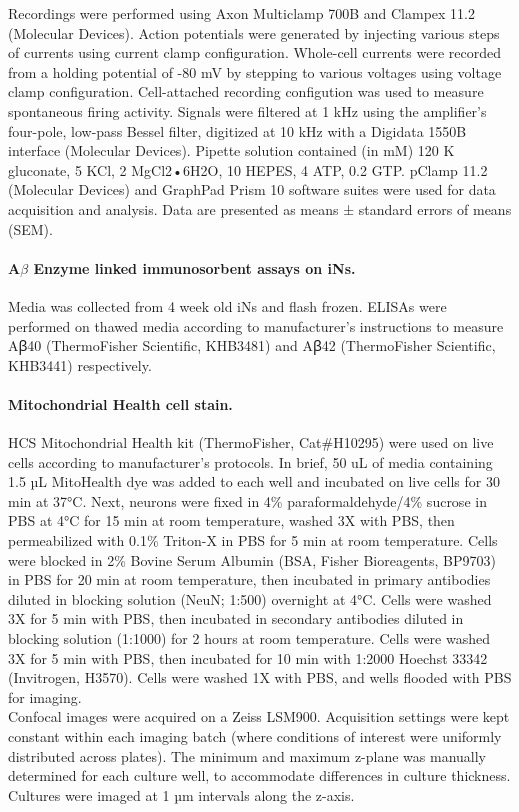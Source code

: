 Recordings were performed using Axon Multiclamp 700B and Clampex 11.2 (Molecular Devices). Action potentials were generated by injecting various steps of currents using current clamp configuration.  Whole-cell currents were recorded from a holding potential of -80 mV by stepping to various voltages using voltage clamp configuration. Cell-attached recording configution was used to measure spontaneous firing activity. Signals were filtered at 1 kHz using the amplifier’s four-pole, low-pass Bessel filter, digitized at 10 kHz with a Digidata 1550B interface (Molecular Devices). Pipette solution contained (in mM) 120 K gluconate, 5 KCl, 2 MgCl2•6H2O, 10 HEPES, 4 ATP, 0.2 GTP. pClamp 11.2 (Molecular Devices) and GraphPad Prism 10 software suites were used for data acquisition and analysis. Data are presented as means ± standard errors of means (SEM).

\paragraph{A$\beta$ Enzyme linked immunosorbent assays on iNs.}
Media was collected from 4 week old iNs and flash frozen. ELISAs were performed on thawed media according to manufacturer’s instructions to measure Aꞵ40 (ThermoFisher Scientific, KHB3481) and Aꞵ42 (ThermoFisher Scientific, KHB3441) respectively.

\paragraph{Mitochondrial Health cell stain.}
HCS Mitochondrial Health kit (ThermoFisher, Cat\#H10295) were used on live cells according to manufacturer’s protocols. In brief, 50 uL of media containing 1.5 µL MitoHealth dye was added to each well and incubated on live cells for 30 min at 37°C. Next, neurons were fixed in 4\% paraformaldehyde/4\% sucrose in PBS at 4°C for 15 min at room temperature, washed 3X with PBS, then permeabilized with 0.1\% Triton-X in PBS for 5 min at room temperature. Cells were blocked in 2\% Bovine Serum Albumin (BSA, Fisher Bioreagents, BP9703) in PBS for 20 min at room temperature, then incubated in primary antibodies diluted in blocking solution (NeuN; 1:500) overnight at 4°C. Cells were washed 3X for 5 min with PBS, then incubated in secondary antibodies diluted in blocking solution (1:1000) for 2 hours at room temperature. Cells were washed 3X for 5 min with PBS, then incubated for 10 min with 1:2000 Hoechst 33342 (Invitrogen, H3570). Cells were washed 1X with PBS, and wells flooded with PBS for imaging.\\
Confocal images were acquired on a Zeiss LSM900. Acquisition settings were kept constant within each imaging batch (where conditions of interest were uniformly distributed across plates). The minimum and maximum z-plane was manually determined for each culture well, to accommodate differences in culture thickness. Cultures were imaged at 1 µm intervals along the z-axis.

